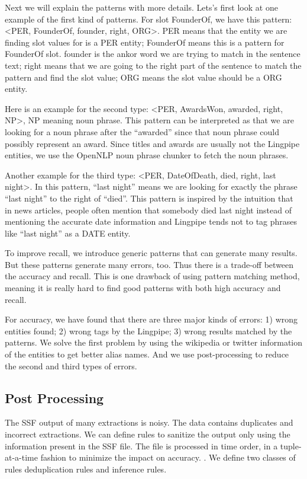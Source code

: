 Next we will explain the patterns with more details. Lets’s first look at one example of the first kind of patterns. For slot FounderOf, we have this pattern: <PER, FounderOf, founder, right, ORG>. PER means that the entity we are finding slot values for is a PER entity; FounderOf means this is a pattern for FounderOf slot. founder is the ankor word we are trying to match in the sentence text; right means that we are going to the right part of the sentence to match the pattern and find the slot value; ORG means the slot value should be a ORG entity.

Here is an example for the second type: <PER, AwardsWon, awarded, right, NP>, NP meaning noun phrase. This pattern can be interpreted as that we are looking for a noun phrase after the “awarded” since that noun phrase could possibly represent an award. Since titles and awards are usually not the Lingpipe entities, we use the OpenNLP noun phrase chunker to fetch the noun phrases.

Another example for the third type: <PER, DateOfDeath, died, right, last night>. In this pattern, “last night” means we are looking for exactly the phrase “last night” to the right of “died”. This pattern is inspired by the intuition that in news articles, people often mention that somebody died last night instead of mentioning the accurate date information and Lingpipe tends not to tag phrases like “last night” as a DATE entity. 

To improve recall, we introduce generic patterns that can generate many results. But these patterns generate many errors, too. Thus there is a trade-off between the accuracy and recall. This is one drawback of using pattern matching method, meaning it is really hard to find good patterns with both high accuracy and recall. 

For accuracy, we have found that there are three major kinds of errors: 1) wrong entities found; 2) wrong tags by the Lingpipe; 3) wrong results matched by the patterns. We solve the first problem by using the wikipedia or twitter information of the entities to get better alias names. And we use post-processing to reduce the second and third types of errors.

\subsection{Post Processing}

The SSF output of many extractions is noisy. The data contains duplicates and incorrect extractions. We can define rules to sanitize the output only using the information present in the SSF file. The file is processed in time order, in a tuple-at-a-time fashion to minimize the impact on accuracy. . We define two classes of rules deduplication rules and inference rules.

